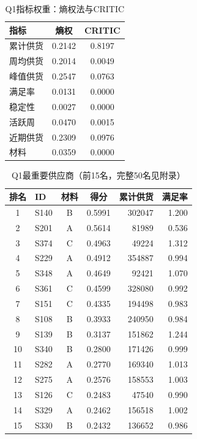 \documentclass[12pt,a4paper]{ctexart}
\begin{document}
\begin{table}[H]
\centering
\caption{Q1指标权重：熵权法与CRITIC}
\label{tab:weights}
\begin{tabular}{lcc}
\toprule
指标 & 熵权 & CRITIC \\
\midrule
累计供货 & 0.2142 & 0.8197 \\
周均供货 & 0.2014 & 0.0049 \\
峰值供货 & 0.2547 & 0.0763 \\
满足率 & 0.0131 & 0.0000 \\
稳定性 & 0.0027 & 0.0000 \\
活跃周 & 0.0470 & 0.0015 \\
近期供货 & 0.2309 & 0.0976 \\
材料 & 0.0359 & 0.0000 \\
\bottomrule
\end{tabular}
\end{table}

\begin{table}[H]
\centering
\caption{Q1最重要供应商（前15名，完整50名见附录）}
\label{tab:top15}
\begin{tabular}{clccrr}
\toprule
排名 & ID & 材料 & 得分 & 累计供货 & 满足率 \\
\midrule
1 & S140 & B & 0.5991 & 302047 & 1.200 \\
2 & S201 & A & 0.5614 & 81989 & 0.536 \\
3 & S374 & C & 0.4963 & 49224 & 1.312 \\
4 & S229 & A & 0.4912 & 354887 & 0.994 \\
5 & S348 & A & 0.4649 & 92421 & 1.070 \\
6 & S361 & C & 0.4599 & 328080 & 0.992 \\
7 & S151 & C & 0.4335 & 194498 & 0.983 \\
8 & S108 & B & 0.3933 & 240950 & 0.984 \\
9 & S139 & B & 0.3137 & 151862 & 1.244 \\
10 & S340 & B & 0.2800 & 171426 & 0.999 \\
11 & S282 & A & 0.2770 & 169340 & 1.013 \\
12 & S275 & A & 0.2576 & 158553 & 1.003 \\
13 & S126 & C & 0.2483 & 47540 & 0.990 \\
14 & S329 & A & 0.2462 & 156518 & 1.002 \\
15 & S330 & B & 0.2432 & 136652 & 0.986 \\
\bottomrule
\end{tabular}
\end{table}
\end{document}
